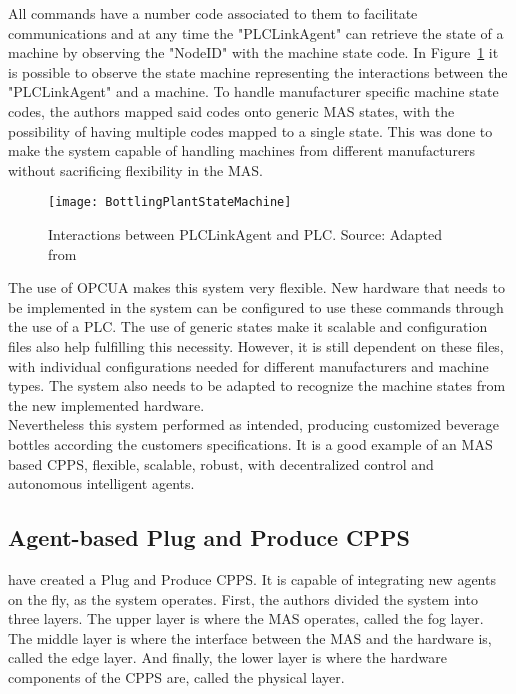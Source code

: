All commands have a number code associated to them to facilitate communications and at any time the "PLCLinkAgent" can retrieve the state of a machine by observing the "NodeID" with the machine state code. In Figure~\ref{fig:bottling_plant_state_achine} it is possible to observe the state machine representing the interactions between the "PLCLinkAgent" and a machine. To handle manufacturer specific machine state codes, the authors mapped said codes onto generic \acrshort{MAS} states, with the possibility of having multiple codes mapped to a single state. This was done to make the system capable of handling machines from different manufacturers without sacrificing flexibility in the \acrshort{MAS}.\\

\begin{figure}[H]
	\centering
	\texttt{[image: BottlingPlantStateMachine]}
	\caption{Interactions between PLCLinkAgent and \acrshort{PLC}. Source: Adapted from \cite{bottling_plant_part2}}
	\label{fig:bottling_plant_state_achine}
\end{figure}

The use of \acrshort{OPCUA} makes this system very flexible. New hardware that needs to be implemented in the system can be configured to use these commands through the use of a \acrshort{PLC}. The use of generic states make it scalable and configuration files also help fulfilling this necessity. However, it is still dependent on these files, with individual configurations needed for different manufacturers and machine types. The system also needs to be adapted to recognize the machine states from the new implemented hardware.\\

Nevertheless this system performed as intended, producing customized beverage bottles according the customers specifications. It is a good example of an \acrshort{MAS} based \acrshort{CPPS}, flexible, scalable, robust, with decentralized control and autonomous intelligent agents.\\
 
\subsection{Agent-based Plug and Produce CPPS}
\label{agent_plug_and_produce}

\citeauthor{8972169} \cite{8972169} have created a Plug and Produce \acrshort{CPPS}. It is capable of integrating new agents on the fly, as the system operates. First, the authors divided the system into three layers. The upper layer is where the \acrshort{MAS} operates, called the fog layer. The middle layer is where the interface between the \acrshort{MAS} and the hardware is, called the edge layer. And finally, the lower layer is where the hardware components of the \acrshort{CPPS} are, called the physical layer.\\

